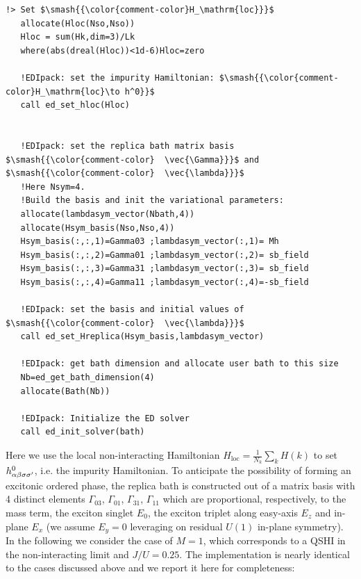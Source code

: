 \documentclass[edipack_sp.tex]{subfiles}
\begin{document}
\begin{lstlisting}[style=fstyle,numbers=none,basicstyle={\scriptsize\ttfamily}]
   !> Set $\smash{{\color{comment-color}H_\mathrm{loc}}}$ 
   allocate(Hloc(Nso,Nso))
   Hloc = sum(Hk,dim=3)/Lk
   where(abs(dreal(Hloc))<1d-6)Hloc=zero

   !EDIpack: set the impurity Hamiltonian: $\smash{{\color{comment-color}H_\mathrm{loc}\to h^0}}$
   call ed_set_hloc(Hloc)


   !EDIpack: set the replica bath matrix basis $\smash{{\color{comment-color}  \vec{\Gamma}}}$ and $\smash{{\color{comment-color}  \vec{\lambda}}}$
   !Here Nsym=4.
   !Build the basis and init the variational parameters:
   allocate(lambdasym_vector(Nbath,4))
   allocate(Hsym_basis(Nso,Nso,4))
   Hsym_basis(:,:,1)=Gamma03 ;lambdasym_vector(:,1)= Mh
   Hsym_basis(:,:,2)=Gamma01 ;lambdasym_vector(:,2)= sb_field
   Hsym_basis(:,:,3)=Gamma31 ;lambdasym_vector(:,3)= sb_field
   Hsym_basis(:,:,4)=Gamma11 ;lambdasym_vector(:,4)=-sb_field
   
   !EDIpack: set the basis and initial values of $\smash{{\color{comment-color}  \vec{\lambda}}}$
   call ed_set_Hreplica(Hsym_basis,lambdasym_vector)
   
   !EDIpack: get bath dimension and allocate user bath to this size
   Nb=ed_get_bath_dimension(4)
   allocate(Bath(Nb))
   
   !EDIpack: Initialize the ED solver
   call ed_init_solver(bath)
\end{lstlisting}
Here we use the local non-interacting Hamiltonian 
$H_\mathrm{loc}=\tfrac{1}{N_k}\sum_k H(k)$ to set 
$h^0_{\alpha\beta\sigma\sigma'}$, i.e. the impurity Hamiltonian. To anticipate the
possibility of forming an excitonic ordered phase, the replica bath
is constructed out of a matrix basis with 4 distinct elements
$\Gamma_{03}$, $\Gamma_{01}$, $\Gamma_{31}$, $\Gamma_{11}$ which are proportional, respectively, to the mass term, the exciton singlet
$E_0$, the exciton triplet along easy-axis $E_z$ and in-plane
$E_x$ (we assume $E_y=0$ leveraging on residual $U(1)$ in-plane symmetry). 
In the following we consider the case of $M=1$, which corresponds to a QSHI in the non-interacting limit and $J/U=0.25$.
The implementation is nearly identical to the cases discussed above and
we report it here for completeness:
\end{document}
